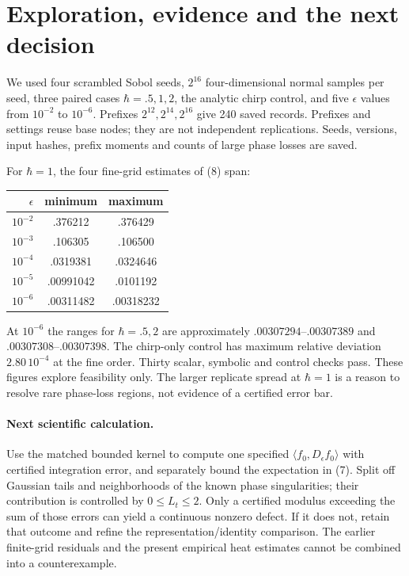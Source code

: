 \documentclass[11pt,a4paper]{article}
\begin{document}
\newpage
\section{Exploration, evidence and the next decision}
We used four scrambled Sobol seeds, $2^{16}$ four-dimensional
normal samples per seed, three paired cases
$\hbar=.5,1,2$, the analytic chirp control, and five
$\epsilon$ values from $10^{-2}$ to $10^{-6}$.
Prefixes $2^{12},2^{14},2^{16}$ give 240 saved records.
Prefixes and settings reuse base nodes; they are not independent
replications. Seeds, versions, input hashes, prefix moments and
counts of large phase losses are saved.

For $\hbar=1$, the four fine-grid estimates of (8) span:
\begin{center}
\begin{tabular}{rcc}
\toprule
$\epsilon$ & minimum & maximum\\
\midrule
$10^{-2}$ & .376212 & .376429\\
$10^{-3}$ & .106305 & .106500\\
$10^{-4}$ & .0319381 & .0324646\\
$10^{-5}$ & .00991042 & .0101192\\
$10^{-6}$ & .00311482 & .00318232\\
\bottomrule
\end{tabular}
\end{center}
At $10^{-6}$ the ranges for $\hbar=.5,2$ are approximately
$.00307294$--$.00307389$ and $.00307308$--$.00307398$.
The chirp-only control has maximum relative deviation
$2.80\,10^{-4}$ at the fine order. Thirty scalar, symbolic and
control checks pass. These figures explore feasibility only.
The larger replicate spread at $\hbar=1$ is a reason to resolve
rare phase-loss regions, not evidence of a certified error bar.

\paragraph{Next scientific calculation.}
Use the matched bounded kernel to compute one specified
$\langle f_0,D_\epsilon f_0\rangle$ with certified integration error,
and separately bound the expectation in (7). Split off Gaussian
tails and neighborhoods of the known phase singularities; their
contribution is controlled by $0\leq L_t\leq2$.
Only a certified modulus exceeding the sum of those errors can
yield a continuous nonzero defect. If it does not, retain that
outcome and refine the representation/identity comparison.
The earlier finite-grid residuals and the present empirical
heat estimates cannot be combined into a counterexample.
\end{document}
